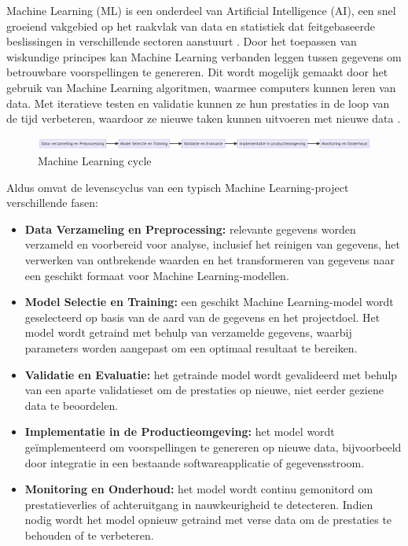Machine Learning (ML) is een onderdeel van Artificial Intelligence (AI), een snel groeiend vakgebied op het raakvlak van data en statistiek dat feitgebaseerde beslissingen in verschillende sectoren aanstuurt \autocite{Jordan2015}. Door het toepassen van wiskundige principes kan Machine Learning verbanden leggen tussen gegevens om betrouwbare voorspellingen te genereren. Dit wordt mogelijk gemaakt door het gebruik van Machine Learning algoritmen, waarmee computers kunnen leren van data. Met iteratieve testen en validatie kunnen ze hun prestaties in de loop van de tijd verbeteren, waardoor ze nieuwe taken kunnen uitvoeren met nieuwe data \autocite{Shaveta2023}.\newline

\begin{figure}[h]
    \includegraphics[width=\linewidth]{graphics/mlcycle.png}
    \caption{Machine Learning cycle}
    \label{fig:ML_cycle}
\end{figure}

Aldus \textcite{Schlegel2022} omvat de levenscyclus van een typisch Machine Learning-project verschillende fasen:

\begin{itemize}
    \item \textbf{Data Verzameling en Preprocessing:} relevante gegevens worden verzameld en voorbereid voor analyse, inclusief het reinigen van gegevens, het verwerken van ontbrekende waarden en het transformeren van gegevens naar een geschikt formaat voor Machine Learning-modellen.
    
    \item \textbf{Model Selectie en Training:} een geschikt Machine Learning-model wordt geselecteerd op basis van de aard van de gegevens en het projectdoel. Het model wordt getraind met behulp van verzamelde gegevens, waarbij parameters worden aangepast om een optimaal resultaat te bereiken.
    
    \item \textbf{Validatie en Evaluatie:} het getrainde model wordt gevalideerd met behulp van een aparte validatieset om de prestaties op nieuwe, niet eerder geziene data te beoordelen.
    
    \item \textbf{Implementatie in de Productieomgeving:} het model wordt geïmplementeerd om voorspellingen te genereren op nieuwe data, bijvoorbeeld door integratie in een bestaande softwareapplicatie of gegevensstroom.

    \item \textbf{Monitoring en Onderhoud:} het model wordt continu gemonitord om prestatieverlies of achteruitgang in nauwkeurigheid te detecteren. Indien nodig wordt het model opnieuw getraind met verse data om de prestaties te behouden of te verbeteren.
\end{itemize}

